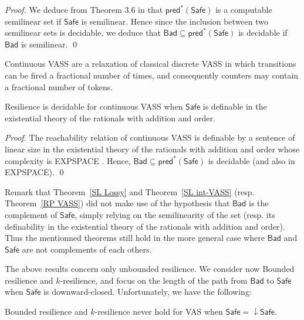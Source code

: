 \documentclass[runningheads]{llncs}
\newcommand{\pred}{\textsf{pred}}
\newcommand{\Bad}{\textsf{Bad}}
\newcommand{\Safe}{\textsf{Safe}}
\begin{document}
\begin{proof}
We deduce from Theorem 3.6 in \cite{DBLP:conf/rp/Schnoebelen10} that $\pred^*(\Safe)$ is a computable semilinear set if $\Safe$ is semilinear. Hence since the inclusion between two semilinear sets is decidable, we deduce that $\Bad \subseteq \pred^*(\Safe)$ is decidable if $\Bad$ is semilinear. \qed
\end{proof}





Continuous VASS \cite{DBLP:journals/tocl/BlondinFHH17} are a relaxation of classical discrete VASS in which transitions can be fired a fractional number of times, and consequently counters may contain a fractional number of tokens.

\begin{theorem}\label{RP VASS}
{\sc Resilience} is decidable for continuous VASS when $\Safe$  is
definable in the existential theory of the rationals with addition and order.
\end{theorem}

\begin{proof}
The reachability relation of continuous VASS is definable by a sentence of linear size in the existential theory of
the rationals with addition and order whose complexity is EXPSPACE \cite{DBLP:journals/tocl/BlondinFHH17}. Hence, $\Bad \subseteq \pred^*(\Safe)$ is decidable (and also in EXPSPACE). \qed
\end{proof}


Remark that
Theorem~\ref{SL Lossy} and
Theorem~\ref{SL int-VASS}
(resp. Theorem~\ref{RP VASS})
did not make use of the hypothesis that $\Bad$ is the complement of $\Safe$, simply relying on the
semilinearity of the set (resp. its definability in the existential theory of the rationals with addition and order). Thus 
the mentionned theorems still hold in the more general case where $\Bad$ and $\Safe$ are not complements of each others.

The above results concern only unbounded resilience. We consider now 
{\sc Bounded resilience} and {\sc $k$-resilience}, and focus on the length of
the path from $\Bad$ to $\Safe$
when $\Safe$ is downward-closed. Unfortunately, we have the following:
\begin{proposition}
{\sc Bounded resilience} and {\sc $k$-resilience} never hold for VAS when $\Safe = \downarrow \Safe$.
\end{proposition}
\end{document}
